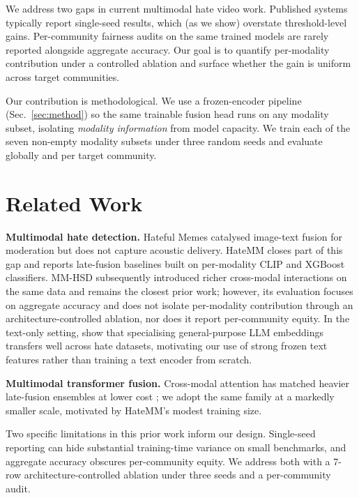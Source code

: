 \documentclass{article}
\begin{document}
We address two gaps in current multimodal hate video work. Published systems typically report single-seed results, which (as we show) overstate threshold-level gains. Per-community fairness audits on the same trained models are rarely reported alongside aggregate accuracy. Our goal is to quantify per-modality contribution under a controlled ablation and surface whether the gain is uniform across target communities.

Our contribution is methodological. We use a frozen-encoder pipeline (Sec.~\ref{sec:method}) so the same trainable fusion head runs on any modality subset, isolating \emph{modality information} from model capacity. We train each of the seven non-empty modality subsets under three random seeds and evaluate globally and per target community.

\section{Related Work}
\label{sec:related_work}

\textbf{Multimodal hate detection.} Hateful Memes \cite{kiela2020hateful} catalysed image-text fusion for moderation but does not capture acoustic delivery. HateMM \cite{das2023hatemm} closes part of this gap and reports late-fusion baselines built on per-modality CLIP and XGBoost classifiers. MM-HSD \cite{cespedessarrias2025mmhsd} subsequently introduced richer cross-modal interactions on the same data and remains the closest prior work; however, its evaluation focuses on aggregate accuracy and does not isolate per-modality contribution through an architecture-controlled ablation, nor does it report per-community equity. In the text-only setting, \cite{cheremetiev2025specializing} show that specialising general-purpose LLM embeddings transfers well across hate datasets, motivating our use of strong frozen text features rather than training a text encoder from scratch.

\textbf{Multimodal transformer fusion.} Cross-modal attention has matched heavier late-fusion ensembles at lower cost \cite{nagrani2021attention}; we adopt the same family at a markedly smaller scale, motivated by HateMM's modest training size.

Two specific limitations in this prior work inform our design. Single-seed reporting can hide substantial training-time variance on small benchmarks, and aggregate accuracy obscures per-community equity. We address both with a 7-row architecture-controlled ablation under three seeds and a per-community audit.
\end{document}

